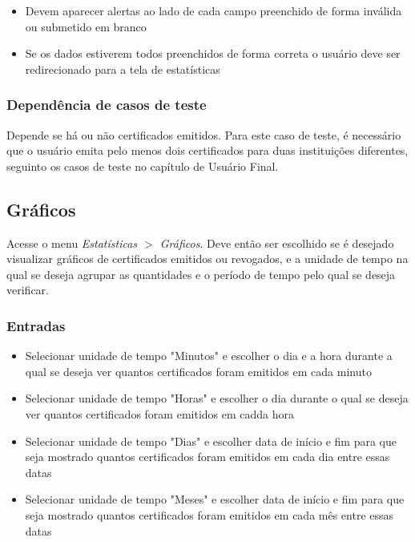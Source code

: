 \begin{itemize}

	\item Devem aparecer alertas ao lado de cada campo preenchido de forma inválida ou submetido em branco
	\item Se os dados estiverem todos preenchidos de forma correta o usuário deve ser redirecionado para a tela de estatísticas
	
\end{itemize}

\subsubsection{Dependência de casos de teste}
Depende se há ou não certificados emitidos. Para este caso de teste, é necessário que o usuário emita pelo menos dois certificados para duas instituições diferentes, seguinto os casos de teste no capítulo de Usuário Final.

\subsection{Gráficos}

Acesse o menu \textit{Estatísticas $>$ Gráficos}. Deve então ser escolhido se é desejado visualizar gráficos de certificados emitidos ou revogados, e a unidade de tempo na qual se deseja agrupar as quantidades e o período de tempo pelo qual se deseja verificar.

\subsubsection{Entradas}

\begin{itemize}

    \item Selecionar unidade de tempo "Minutos" e escolher o dia e a hora durante a qual se deseja ver quantos certificados foram emitidos em cada minuto
    \item Selecionar unidade de tempo "Horas" e escolher o dia durante o qual se deseja ver quantos certificados foram emitidos em cadda hora
    \item Selecionar unidade de tempo "Dias" e escolher data de início e fim para que seja mostrado quantos certificados foram emitidos em cada dia entre essas datas
    \item Selecionar unidade de tempo "Meses" e escolher data de início e fim para que seja mostrado quantos certificados foram emitidos em cada mês entre essas datas
	
\end{itemize}

